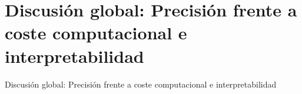 \section{Discusión global: Precisión frente a coste computacional e interpretabilidad}
    Discusión global: Precisión frente a coste computacional e interpretabilidad